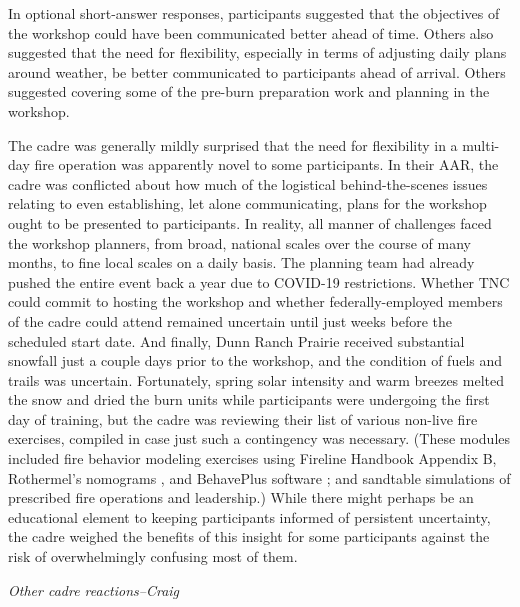\documentclass[fire,article,submit,moreauthors,pdftex]{Definitions/mdpi}
\begin{document}
In optional short-answer responses, participants suggested that the objectives of the workshop could have been communicated better ahead of time.
Others also suggested that the need for flexibility, especially in terms of adjusting daily plans around weather, be better communicated to participants ahead of arrival.
Others suggested covering some of the pre-burn preparation work and planning in the workshop.

The cadre was generally mildly surprised that the need for flexibility in a multi-day fire operation was apparently novel to some participants.
In their AAR, the cadre was conflicted about how much of the logistical behind-the-scenes issues relating to even establishing, let alone communicating, plans for the workshop ought to be presented to participants.
In reality, all manner of challenges faced the workshop planners, from broad, national scales over the course of many months, to fine local scales on a daily basis.
The planning team had already pushed the entire event back a year due to COVID-19 restrictions.
Whether TNC could commit to hosting the workshop and whether federally-employed members of the cadre could attend remained uncertain until just weeks before the scheduled start date.
And finally, Dunn Ranch Prairie received substantial snowfall just a couple days prior to the workshop, and the condition of fuels and trails was uncertain.
Fortunately, spring solar intensity and warm breezes melted the snow and dried the burn units while participants were undergoing the first day of training, but the cadre was reviewing their list of various non-live fire exercises, compiled in case just such a contingency was necessary.
(These modules included fire behavior modeling exercises using Fireline Handbook Appendix B, Rothermel's nomograms \citep{rothermel1983}, and BehavePlus software \citep{heinsch2010}; and sandtable simulations of prescribed fire operations and leadership.)
While there might perhaps be an educational element to keeping participants informed of persistent uncertainty, the cadre weighed the benefits of this insight for some participants against the risk of overwhelmingly confusing most of them.

\emph{Other cadre reactions--Craig}
\end{document}
